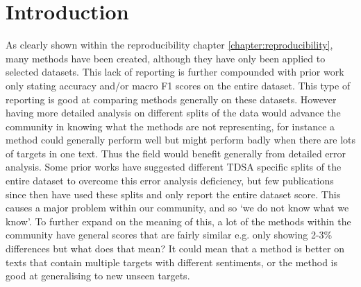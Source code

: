 \section{Introduction}
\label{section:aug_introduction}
As clearly shown within the reproducibility chapter \ref{chapter:reproducibility}, many methods have been created, although they have only been applied to selected datasets. This lack of reporting is further compounded with prior work only stating accuracy and/or macro F1 scores on the entire dataset. This type of reporting is good at comparing methods generally on these datasets. However having more detailed analysis on different splits of the data would advance the community in knowing what the methods are not representing, for instance a method could generally perform well but might perform badly when there are lots of targets in one text. Thus the field would benefit generally from detailed error analysis. Some prior works have suggested different TDSA specific splits of the entire dataset to overcome this error analysis deficiency, but few publications since then have used these splits and only report the entire dataset score. This causes a major problem within our community, and so `we do not know what we know'. To further expand on the meaning of this, a lot of the methods within the community have general scores that are fairly similar e.g. only showing 2-3\% differences but what does that mean? It could mean that a method is better on texts that contain multiple targets with different sentiments, or the method is good at generalising to new unseen targets. 

